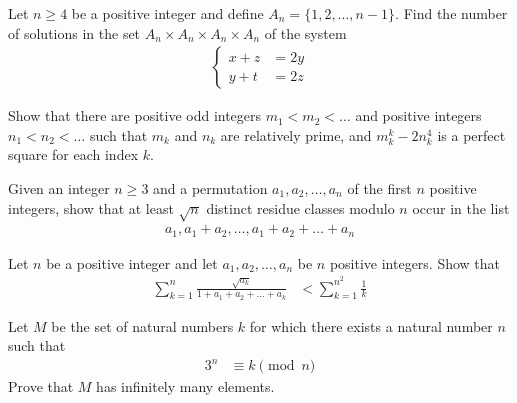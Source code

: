 \begin{problem}
	Let $n \geq 4$ be a positive integer and define $A_n = \{1, 2, \dots, n -1\}$. Find the number of solutions in the set $A_n \times  A_n \times A_n \times A_n$ of the system
	\begin{align*}
		\begin{cases}
			x+z &= 2y\\
			y+t &= 2z
		\end{cases}
	\end{align*}
\end{problem}

\begin{problem}
	Show that there are positive odd integers $m_1 < m_2 < \dots  $ and positive integers $n_1 < n_2 < \dots$ such that $m_k$ and $n_k$ are relatively prime, and $m_k^k - 2n_k^4$ is a perfect square for each index $k$.
\end{problem}


\begin{problem}
	Given an integer $n \geq 3$ and a permutation $a_1, a_2, \dots, a_n$ of the first $n$ positive integers, show that at least $\sqrt n$ distinct residue classes modulo $n$ occur in the list
		\begin{align*}
			a_1, a_1 + a_2, \dots, a_1 + a_2 + \dots + a_n
		\end{align*}
\end{problem}


\begin{problem}
	Let $n$ be a positive integer and let $a_1, a_2, \dots, a_n$ be $n$ positive integers. Show that
	\begin{align*}
		\sum_{k=1}^{n} \frac{\sqrt{a_k}}{1+a_1+a_2+\dots +a_k} &< \sum_{k=1}^{n^2} \frac{1}{k}
	\end{align*}
\end{problem}

\begin{problem}
	Let $M$ be the set of natural numbers $k$ for which there exists a natural number $n$ such that
		\begin{align*}
			3^n
				& \equiv k\pmod n
		\end{align*}
	Prove that $M$ has infinitely many elements. %
\end{problem}


